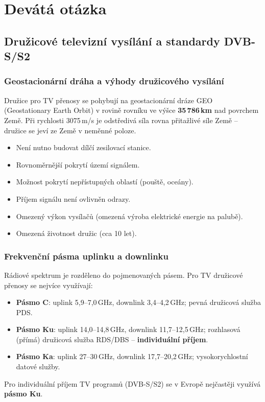 \chapter{Devátá otázka}
\section{Družicové televizní vysílání a standardy DVB-S/S2}

\subsection{Geostacionární dráha a výhody družicového vysílání}
Družice pro TV přenosy se pohybují na geostacionární dráze GEO (Geostationary Earth Orbit) v rovině rovníku ve výšce \textbf{35\,786\,km} nad povrchem Země. Při rychlosti 3075\,m/s je odstředivá síla rovna přitažlivé síle Země -- družice se jeví ze Země v neměnné poloze.
\begin{itemize}
    \item[$\oplus$] Není nutno budovat dílčí zesilovací stanice.
    \item[$\oplus$] Rovnoměrnější pokrytí území signálem.
    \item[$\oplus$] Možnost pokrytí nepřístupných oblastí (pouště, oceány).
    \item[$\oplus$] Příjem signálu není ovlivněn odrazy.
    \item[$\circleddash$] Omezený výkon vysílačů (omezená výroba elektrické energie na palubě).
    \item[$\circleddash$] Omezená životnost družic (cca 10 let).
\end{itemize}

\subsection{Frekvenční pásma uplinku a downlinku}
Rádiové spektrum je rozděleno do pojmenovaných pásem. Pro TV družicové přenosy se nejvíce využívají:
\begin{itemize}
    \item \textbf{Pásmo C}: uplink 5,9--7,0\,GHz, downlink 3,4--4,2\,GHz; pevná družicová služba PDS.
    \item \textbf{Pásmo Ku}: uplink 14,0--14,8\,GHz, downlink 11,7--12,5\,GHz; rozhlasová (přímá) družicová služba RDS/DBS -- \textbf{individuální příjem}.
    \item \textbf{Pásmo Ka}: uplink 27--30\,GHz, downlink 17,7--20,2\,GHz; vysokorychlostní datové služby.
\end{itemize}
Pro individuální příjem TV programů (DVB-S/S2) se v Evropě nejčastěji využívá \textbf{pásmo Ku}.

